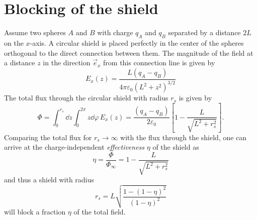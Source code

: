 \section{Blocking of the shield}\label{apx:blocking-of-the-shield}
Assume two spheres $A$ and $B$ with charge $q_A$ and $q_B$ separated by a distance $2L$ on the $x$-axis. A circular shield is placed perfectly in the center of the spheres orthogonal to the direct connection between them. The magnitude of the field at a distance $z$ in the direction $\vec{e}_x$ from this connection line is given by 
\begin{equation}
  E_x(z) = \frac{L(q_A - q_B)}{4\pi\varepsilon_0 (L^2 + z^2)^{3/2}}
\end{equation}
The total flux through the circular shield with radius $r_s$ is given by
\begin{equation}
  \Phi = \int_{0}^{r_s}\dd z \int_{0}^{2\pi} z \dd \varphi \, E_x(z) = \frac{(q_A - q_B)}{2 \varepsilon_0} \left[ 1 - \frac{L}{\sqrt{L^2 + r_s^2}} \right] .
\end{equation}
Comparing the total flux for $r_s \rightarrow \infty$ with the flux through the shield, one can arrive at the charge-independent \emph{effectiveness} $\eta$ of the shield as
\begin{equation}
  \eta = \frac{\Phi}{\Phi_\infty} = 1 - \frac{L}{\sqrt{L^2 + r_s^2}}
\end{equation}
and thus a shield with radius
\begin{equation}
  r_s = L \sqrt{\frac{1 - (1-\eta)^2}{(1-\eta)^2}}
\end{equation}
will block a fraction $\eta$ of the total field.




